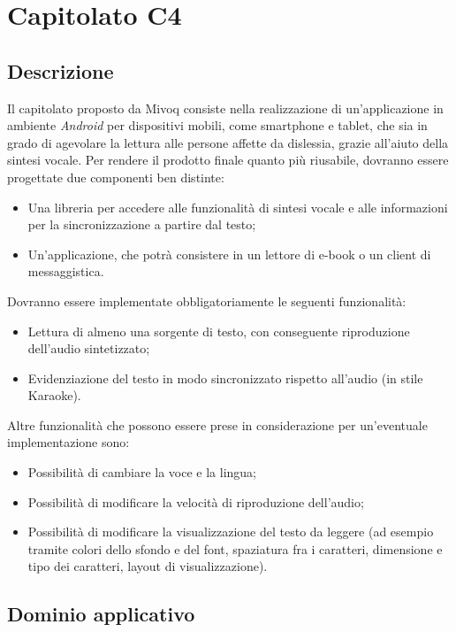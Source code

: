 \newpage
\section{Capitolato C4}

\subsection{Descrizione}

Il capitolato proposto da Mivoq consiste nella realizzazione di un'applicazione
in ambiente \textit{Android} per dispositivi mobili, come smartphone e tablet,
che sia in grado di agevolare la lettura alle persone affette da dislessia,
grazie all'aiuto della sintesi vocale. Per rendere il prodotto finale
quanto più riusabile, dovranno essere progettate due componenti ben
distinte:
\begin{itemize}
	\item Una libreria per accedere alle funzionalità di sintesi vocale e alle informazioni per la sincronizzazione a partire dal testo;
	\item Un'applicazione, che potrà consistere in un lettore di e-book o un client di messaggistica.
\end{itemize}

Dovranno essere implementate obbligatoriamente
le seguenti funzionalità: 
\begin{itemize}
	\item Lettura di almeno una sorgente di testo,
	con conseguente riproduzione dell'audio sintetizzato;
	\item Evidenziazione del testo in modo sincronizzato rispetto all'audio (in stile Karaoke).
\end{itemize}

Altre funzionalità che possono essere prese in considerazione per un'eventuale implementazione sono: 
\begin{itemize}
	\item Possibilità di cambiare la voce e la lingua;
	\item Possibilità di modificare la velocità di riproduzione dell'audio;
	\item Possibilità di modificare la visualizzazione del testo da leggere (ad esempio tramite colori dello sfondo e del font, spaziatura fra i caratteri, dimensione e tipo dei caratteri, layout di visualizzazione).
\end{itemize}

\subsection{Dominio applicativo}

